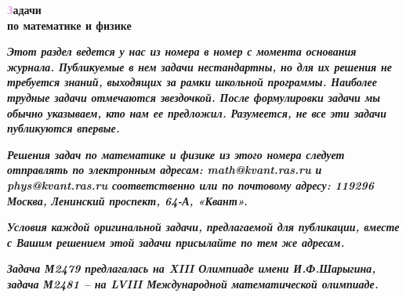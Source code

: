 \thispagestyle{empty}

\noindent
{}

\begin{center}
    \vspace{-0.3em}
    {\fontsize{28}{15}\selectfont
    \textcolor{Plum}{\textbf{З}}\textbf{адачи}} \\
    {\fontsize{28}{15}\selectfont
    \textbf{по математике и физике}}
    \vspace{-0.3em}
\end{center}

\small{\textbf{\textit{
    Этот раздел ведется у нас из номера в номер с момента основания журнала. Публикуемые
    в нем задачи нестандартны, но для их решения не требуется знаний, выходящих за рамки
    школьной программы. Наиболее трудные задачи отмечаются звездочкой. После формулировки 
    задачи мы обычно указываем, кто нам ее предложил. Разумеется, не все эти задачи 
    публикуются впервые.}}}

\small{\textbf{\textit{
    Решения задач по математике и физике из этого номера следует отправлять по электронным 
    адресам: math@kvant.ras.ru и phys@kvant.ras.ru соответственно или по почтовому адресу: 
    119296 Москва, Ленинский проспект, 64-А, «Квант».}}}

\small{\textbf{\textit{
    Условия каждой оригинальной задачи, предлагаемой для публикации, вместе с Вашим 
    решением этой задачи присылайте по тем же адресам.}}}

\small{\textbf{\textit{
    Задача М2479 предлагалась на XIII Олимпиаде имени И.Ф.Шарыгина, задача М2481 – на LVIII 
    Международной математической олимпиаде.}}}

\vspace{0.5em}
\normalsize

